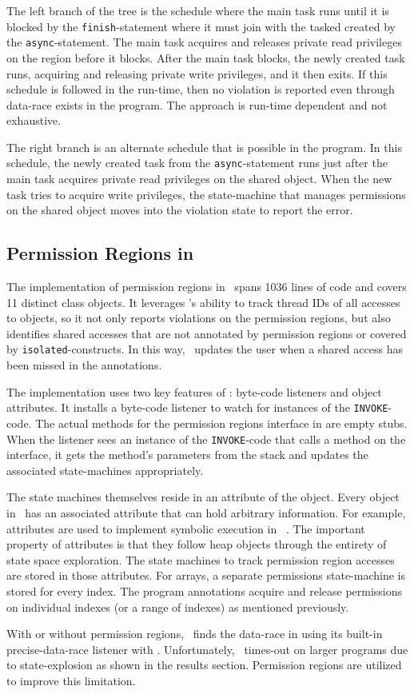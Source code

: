 The left branch of the tree is the schedule where the main task runs
until it is blocked by the \texttt{finish}-statement where it must
join with the tasked created by the \texttt{async}-statement. The main
task acquires and releases private read privileges on the region
before it blocks. After the main task blocks, the newly created task
runs, acquiring and releasing private write privileges, and it then
exits. If this schedule is followed in the run-time, then no
violation is reported even through data-race exists in the
program. The approach is run-time dependent and not exhaustive.

The right branch is an alternate schedule that is possible in the
program. In this schedule, the newly created task from the
\texttt{async}-statement runs just after the main task acquires private
read privileges on the shared object. When the new task tries to
acquire write privileges, the state-machine that manages permissions on
the shared object moves into the violation state to report the error.

\subsection{Permission Regions in \jpf}

The implementation of permission regions in \jpf\ spans 1036
lines of code and covers 11 distinct class objects. It leverages
\jpf's ability to track thread IDs of all accesses to objects, so it not only reports
violations on the permission regions, but also identifies shared
accesses that are not annotated by permission regions or covered by \texttt{isolated}-constructs. In this way,
\jpf\ updates the user when a shared access has been missed in the
annotations.

The implementation uses two key features of \jpf: byte-code listeners
and object attributes. It installs a byte-code listener to watch for
instances of the \texttt{INVOKE}-code. The actual methods for the permission regions interface in
 are empty stubs. When
the listener sees an instance of the \texttt{INVOKE}-code that calls a
method on the interface, it gets the method's parameters from
the stack and updates the associated state-machines appropriately.

The state machines themselves reside in an attribute of the object. Every object
in \jpf\ has an associated attribute that can hold arbitrary information. For
example, attributes are used to implement symbolic execution in \jpf\
\cite{DBLP:journals/ase/PasareanuVBGMR13}. The important property of attributes
is that they follow heap objects through the entirety of state space
exploration. The state machines to track permission region accesses are stored
in those attributes. For arrays, a separate permissions state-machine is stored
for every index. The program annotations acquire and release permissions on
individual indexes (or a range of indexes) as mentioned previously.

With or without permission regions, \jpf\ finds the data-race in
\figref{fig:hj-async-finish-pr} using its built-in precise-data-race
listener with \hjv. Unfortunately, \jpf\ times-out on larger programs due to
state-explosion as shown in the results section. Permission regions
are utilized to improve this limitation.
